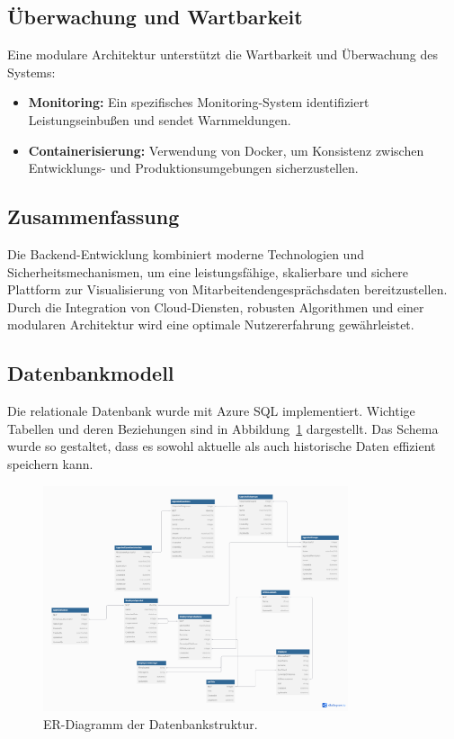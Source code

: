 \subsection{Überwachung und Wartbarkeit}
Eine modulare Architektur unterstützt die Wartbarkeit und Überwachung des Systems:
\begin{itemize}
    \item \textbf{Monitoring:} Ein spezifisches Monitoring-System identifiziert Leistungseinbußen und sendet Warnmeldungen.
    \item \textbf{Containerisierung:} Verwendung von Docker, um Konsistenz zwischen Entwicklungs- und Produktionsumgebungen sicherzustellen.
\end{itemize}

\subsection{Zusammenfassung}
Die Backend-Entwicklung kombiniert moderne Technologien und Sicherheitsmechanismen, um eine leistungsfähige, skalierbare und sichere Plattform zur Visualisierung von Mitarbeitendengesprächsdaten bereitzustellen. Durch die Integration von Cloud-Diensten, robusten Algorithmen und einer modularen Architektur wird eine optimale Nutzererfahrung gewährleistet.


\subsection{Datenbankmodell}
Die relationale Datenbank wurde mit Azure SQL implementiert. Wichtige Tabellen und deren Beziehungen sind in Abbildung~\ref{fig:db_er_model} dargestellt. Das Schema wurde so gestaltet, dass es sowohl aktuelle als auch historische Daten effizient speichern kann.

\begin{figure}[h!]
    \centering
    \includegraphics[width=0.8\textwidth]{images/er_modell_design.png}
    \caption{ER-Diagramm der Datenbankstruktur.}
    \label{fig:db_er_model}
\end{figure}

